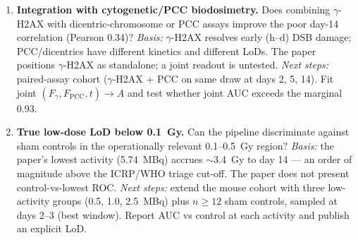 \begin{enumerate}
\item \textbf{Integration with cytogenetic/PCC biodosimetry.}
Does combining $\gamma$-H2AX with dicentric-chromosome or PCC assays
improve the poor day-14 correlation (Pearson 0.34)?
\emph{Basis:} $\gamma$-H2AX resolves early (h--d) DSB damage;
PCC/dicentrics have different kinetics and different LoDs. The paper
positions $\gamma$-H2AX as standalone; a joint readout is untested.
\emph{Next steps:} paired-assay cohort ($\gamma$-H2AX + PCC on same
draw at days 2, 5, 14). Fit joint $(F_{\gamma},F_{\mathrm{PCC}},t)
\!\to\!A$ and test whether joint AUC exceeds the marginal 0.93.

\item \textbf{True low-dose LoD below 0.1~Gy.}
Can the pipeline discriminate against sham controls in the operationally
relevant 0.1--0.5~Gy region?
\emph{Basis:} the paper's lowest activity (5.74~MBq) accrues
$\sim$3.4~Gy to day 14 — an order of magnitude above the ICRP/WHO
triage cut-off. The paper does not present control-vs-lowest ROC.
\emph{Next steps:} extend the mouse cohort with three low-activity
groups (0.5, 1.0, 2.5~MBq) plus $n{\ge}12$ sham controls, sampled at
days 2--3 (best window). Report AUC vs control at each activity and
publish an explicit LoD.
\end{enumerate}
